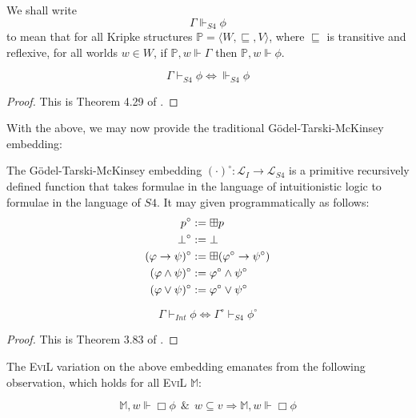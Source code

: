 \begin{definition}
We shall write
\[ \Gamma \Vdash_{S4} \phi \]
to mean that for all Kripke structures
$\mathbb{P} = \langle W, \sqsubseteq, V\rangle$, where $\sqsubseteq$
is transitive and reflexive, for all worlds $w \in W$,
 if $\mathbb{P},w \Vdash \Gamma$ then
$\mathbb{P},w \Vdash \phi$.
\end{definition}

\begin{theorem}
\[ \Gamma \vdash_{S4} \phi \iff \Vdash_{S4} \phi \]
\end{theorem}
\begin{proof}
This is Theorem 4.29 of \cite[chapter 4.3, pg. 205]{blackburn_modal_2001}.
\end{proof}

With the above, we may now provide the traditional G\"{o}del-Tarski-McKinsey embedding:

\begin{mydef}
The  G\"{o}del-Tarski-McKinsey embedding $(\cdot)^\circ :
\mathcal{L}_I \to \mathcal{L}_{S4}$ is a primitive recursively
defined function that takes formulae in the language of intuitionistic
logic to formulae in the language of $S4$.  It may given
programmatically as follows: 
\begin{align*}
  p^\circ & := \boxplus p \\
  \bot^\circ & := \bot \\
  (\varphi \to \psi)^\circ & := \boxplus(\varphi^\circ \to \psi^\circ) \\
  (\varphi \wedge \psi)^\circ & := \varphi^\circ \wedge \psi^\circ \\
  (\varphi \vee \psi)^\circ & := \varphi^\circ \vee \psi^\circ \\
\end{align*}
\end{mydef}

\begin{theorem}
\[ \Gamma \vdash_{Int} \phi \iff \Gamma^\circ \vdash_{S4} \phi^\circ \]
\end{theorem}
\begin{proof}
  This is Theorem 3.83 of \cite[chapter 3, pg. 97]{chagrov_modal_1997}.
\end{proof}

The \textsc{EviL} variation on the above embedding emanates from the
following observation, which holds for all \textsc{EviL} $\mathbb{M}$:

\[ \mathbb{M},w \Vdash \Box \phi\ \  \&\ \ w \subseteq v
\Longrightarrow \mathbb{M},w \Vdash \Box \phi \]

